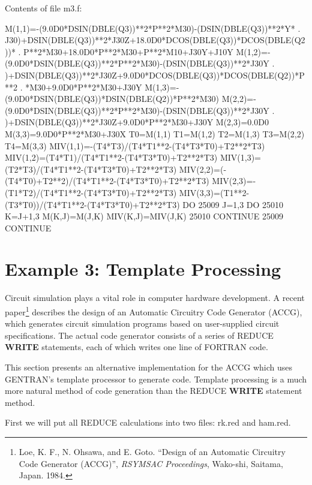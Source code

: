 Contents of file m3.f:
\begin{framedverbatim}
      M(1,1)=-(9.0D0*DSIN(DBLE(Q3))**2*P**2*M30)-(DSIN(DBLE(Q3))**2*Y*
     . J30)+DSIN(DBLE(Q3))**2*J30Z+18.0D0*DCOS(DBLE(Q3))*DCOS(DBLE(Q2))*
     . P**2*M30+18.0D0*P**2*M30+P**2*M10+J30Y+J10Y
      M(1,2)=-(9.0D0*DSIN(DBLE(Q3))**2*P**2*M30)-(DSIN(DBLE(Q3))**2*J30Y
     . )+DSIN(DBLE(Q3))**2*J30Z+9.0D0*DCOS(DBLE(Q3))*DCOS(DBLE(Q2))*P**2
     . *M30+9.0D0*P**2*M30+J30Y
      M(1,3)=-(9.0D0*DSIN(DBLE(Q3))*DSIN(DBLE(Q2))*P**2*M30)
      M(2,2)=-(9.0D0*DSIN(DBLE(Q3))**2*P**2*M30)-(DSIN(DBLE(Q3))**2*J30Y
     . )+DSIN(DBLE(Q3))**2*J30Z+9.0D0*P**2*M30+J30Y
      M(2,3)=0.0D0
      M(3,3)=9.0D0*P**2*M30+J30X
      T0=M(1,1)
      T1=M(1,2)
      T2=M(1,3)
      T3=M(2,2)
      T4=M(3,3)
      MIV(1,1)=-(T4*T3)/(T4*T1**2-(T4*T3*T0)+T2**2*T3)
      MIV(1,2)=(T4*T1)/(T4*T1**2-(T4*T3*T0)+T2**2*T3)
      MIV(1,3)=(T2*T3)/(T4*T1**2-(T4*T3*T0)+T2**2*T3)
      MIV(2,2)=(-(T4*T0)+T2**2)/(T4*T1**2-(T4*T3*T0)+T2**2*T3)
      MIV(2,3)=-(T1*T2)/(T4*T1**2-(T4*T3*T0)+T2**2*T3)
      MIV(3,3)=(T1**2-(T3*T0))/(T4*T1**2-(T4*T3*T0)+T2**2*T3)
      DO 25009 J=1,3
          DO 25010 K=J+1,3
              M(K,J)=M(J,K)
              MIV(K,J)=MIV(J,K)
25010     CONTINUE
25009 CONTINUE
\end{framedverbatim}

\section{Example 3:  Template Processing}
Circuit simulation plays a vital role in computer hardware development.  A
recent paper\footnote{
Loe, K. F., N. Ohsawa, and E. Goto.  ``Design of an Automatic
Circuitry Code Generator (ACCG)'', {\it RSYMSAC Proceedings},
Wako-shi, Saitama, Japan.  1984.} describes the design of an Automatic Circuitry
Code Generator (ACCG), which generates circuit simulation programs
based on user-supplied circuit specifications.  The actual code
generator consists of a series of REDUCE {\bf WRITE} statements, each of
which writes one line of FORTRAN code.

This section presents an alternative implementation for the ACCG
which uses GENTRAN's template processor to generate code.  Template
processing is a much more natural method of code generation than the
REDUCE {\bf WRITE} statement method.

First we will put all REDUCE calculations into two files:  rk.red and
ham.red.


